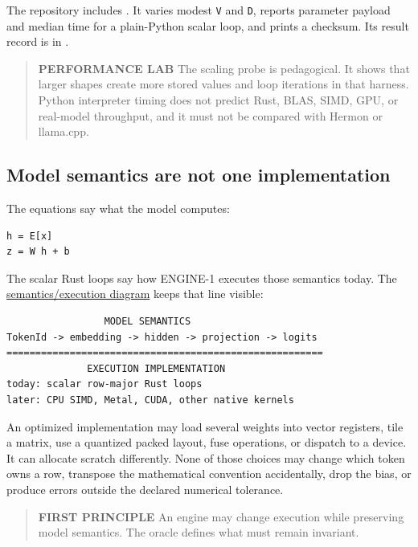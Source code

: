 \documentclass[
  10pt,
]{article}
\begin{document}
The repository includes
\texttt{}.
It varies modest \texttt{V} and \texttt{D}, reports parameter payload
and median time for a plain-Python scalar loop, and prints a checksum.
Its result record is in
\texttt{}.

\begin{quote}
\textbf{PERFORMANCE LAB} The scaling probe is pedagogical. It shows that
larger shapes create more stored values and loop iterations in that
harness. Python interpreter timing does not predict Rust, BLAS, SIMD,
GPU, or real-model throughput, and it must not be compared with Hermon
or llama.cpp.
\end{quote}

\subsection{Model semantics are not one
implementation}\label{model-semantics-are-not-one-implementation}

The equations say what the model computes:

\begin{verbatim}
h = E[x]
z = W h + b
\end{verbatim}

The scalar Rust loops say how ENGINE-1 executes those semantics today.
The
\href{https://github.com/hermonai/inside-the-llm-engine/blob/astra-visual-rewrite/diagrams/model/semantics-vs-execution.txt}{semantics/execution
diagram} keeps that line visible:

\begin{verbatim}
                 MODEL SEMANTICS
TokenId -> embedding -> hidden -> projection -> logits
=======================================================
              EXECUTION IMPLEMENTATION
today: scalar row-major Rust loops
later: CPU SIMD, Metal, CUDA, other native kernels
\end{verbatim}

An optimized implementation may load several weights into vector
registers, tile a matrix, use a quantized packed layout, fuse
operations, or dispatch to a device. It can allocate scratch
differently. None of those choices may change which token owns a row,
transpose the mathematical convention accidentally, drop the bias, or
produce errors outside the declared numerical tolerance.

\begin{quote}
\textbf{FIRST PRINCIPLE} An engine may change execution while preserving
model semantics. The oracle defines what must remain invariant.
\end{quote}
\end{document}
